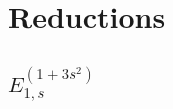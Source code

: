 \documentclass[main]{subfiles}
\begin{document}
\chapter{Reductions}
\section{$E_{1,s}^{(1 + 3s^{2})}$}
\end{document}
